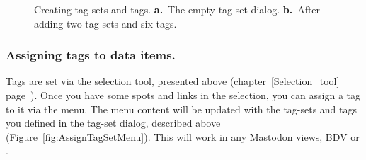 \begin{figure}
    \centering
    \null\hfill
    \hfill
    \hfill\null
    
    \caption{Creating tag-sets and tags. \textbf{a.}~The empty tag-set dialog. \textbf{b.}~After adding two tag-sets and six tags.  }
    \label{fig:CreateTagSet}
\end{figure}


\subsubsection{Assigning tags to data items.}

Tags are set via the selection tool, presented above (chapter~\ref{Selection_tool} page~\pageref{Selection_tool}).
Once you have some spots and links in the selection, you can assign a tag to it via the  menu.
The menu content will be updated with the tag-sets and tags you defined in the tag-set dialog, described above (Figure~\ref{fig:AssignTagSetMenu}).
This will work in any Mastodon views, BDV or \TrackScheme.

